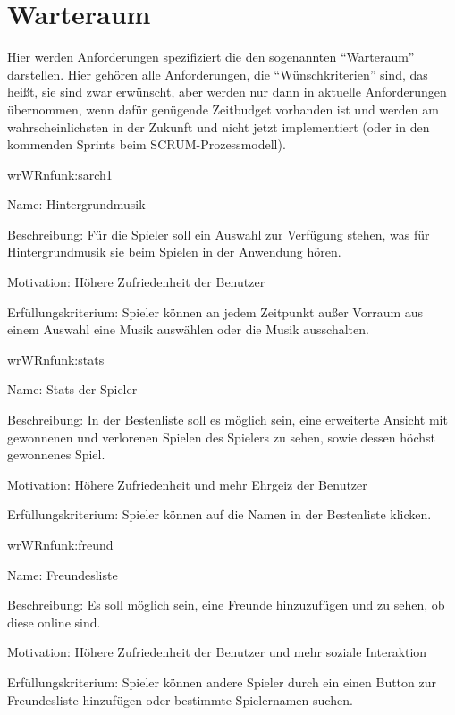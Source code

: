 \chapter{Warteraum}

Hier werden Anforderungen spezifiziert die den sogenannten ``Warteraum'' darstellen. Hier gehören alle Anforderungen, die ``Wünschkriterien'' sind, das heißt, sie sind zwar erwünscht, aber werden nur dann in aktuelle Anforderungen übernommen, wenn dafür genügende Zeitbudget vorhanden ist und werden am wahrscheinlichsten in der Zukunft und nicht jetzt implementiert (oder in den kommenden Sprints beim SCRUM-Prozessmodell).

\setcounter{wr}{10}

\begin{description}[leftmargin=5em, style=sameline]	
	\begin{lhp}{wr}{WR}{nfunk:sarch1}
		\item [Name:] Hintergrundmusik
		\item [Beschreibung:] Für die Spieler soll ein Auswahl zur Verfügung stehen, was für Hintergrundmusik sie beim Spielen in der Anwendung hören.
		\item [Motivation:] Höhere Zufriedenheit der Benutzer
		\item [Erfüllungskriterium:] Spieler können an jedem Zeitpunkt außer Vorraum aus einem Auswahl eine Musik auswählen oder die Musik ausschalten.
	\end{lhp}
\end{description}

\begin{description}[leftmargin=5em, style=sameline]	
	\begin{lhp}{wr}{WR}{nfunk:stats}
		\item [Name:] Stats der Spieler
		\item [Beschreibung:] In der Bestenliste soll es möglich sein, eine erweiterte Ansicht mit gewonnenen und verlorenen Spielen des Spielers zu sehen, sowie dessen höchst gewonnenes Spiel.
		\item [Motivation:] Höhere Zufriedenheit und mehr Ehrgeiz der Benutzer
		\item [Erfüllungskriterium:] Spieler können auf die Namen in der Bestenliste klicken.
	\end{lhp}
\end{description}

\begin{description}[leftmargin=5em, style=sameline]	
	\begin{lhp}{wr}{WR}{nfunk:freund}
		\item [Name:] Freundesliste
		\item [Beschreibung:] Es soll möglich sein, eine Freunde hinzuzufügen und zu sehen, ob diese online sind.
		\item [Motivation:] Höhere Zufriedenheit der Benutzer und mehr soziale Interaktion
		\item [Erfüllungskriterium:] Spieler können andere Spieler durch ein einen Button zur Freundesliste hinzufügen oder bestimmte Spielernamen suchen.
	\end{lhp}
\end{description}

